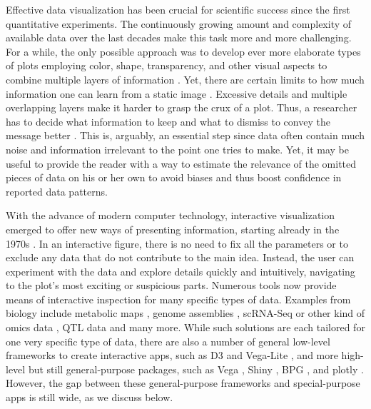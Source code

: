\documentclass[twocolumn,10pt]{article}
\begin{document}
Effective data visualization has been crucial for scientific success since the first quantitative experiments. The continuously growing amount and complexity of available data over the last decades make this task more and more challenging. For a while, the only possible approach was to develop ever more elaborate types of plots employing color, shape, transparency, and other visual aspects to combine multiple layers of information \citep{bertin_2011, tufte_1983, wilkinson_1999}. Yet, there are certain limits to how much information one can learn from a static image \citep{hegarty_2011}. Excessive details and multiple overlapping layers make it harder to grasp the crux of a plot. Thus, a researcher has to decide what information to keep and what to dismiss to convey the message better \citep{odonoghue_2018}. This is, arguably, an essential step since data often contain much noise and information irrelevant to the point one tries to make. Yet, it may be useful to provide the reader with a way to estimate the relevance of the omitted pieces of data on his or her own to avoid biases \citep{bresciani_2009} and thus boost confidence in reported data patterns.

With the advance of modern computer technology, interactive visualization emerged to offer new ways of presenting information, starting already in the 1970s \citep{newman_1979, becker_1987}. In an interactive figure, there is no need to fix all the parameters or to exclude any data that do not contribute to the main idea. Instead, the user can experiment with the data and explore details quickly and intuitively, navigating to the plot's most exciting or suspicious parts. Numerous tools \citep{caldarola_2017} now provide means of interactive inspection for many specific types of data. Examples from biology include metabolic maps \citep{noronha_2017}, genome assemblies \citep{wick_2015}, scRNA-Seq or other kind of omics data \citep{hillje_2020, rue_2018}, QTL data \citep{broman_2015} and many more. While such solutions are each tailored for one very specific type of data, there are also a number of general low-level frameworks to create interactive apps, such as D3 \citep{bostock_2011} and Vega-Lite \citep{satyanarayan_2015}, and more high-level but still general-purpose packages, such as Vega \citep{satyanarayan_2016}, Shiny \citep{shiny}, BPG \citep{p_2019}, and plotly \citep{sievert_2019, sievert_2020}. However, the gap between these general-purpose frameworks and special-purpose apps is still wide, as we discuss below.
\end{document}
